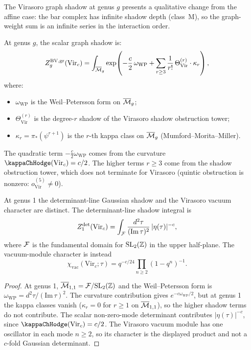 \begin{construction}
The Virasoro graph shadow at genus $g$ presents a qualitative
change from the affine case: the bar complex has infinite shadow depth
(class~M), so the graph-weight sum is an infinite series in the
interaction order.

At genus $g$, the scalar graph shadow is:
\begin{equation}
Z_g^{\mathrm{BV,gr}}(\mathrm{Vir}_c)
 = \int_{\overline{\mathcal{M}}_g}
 \exp\!\left(
 -\frac{c}{2} \, \omega_{\mathrm{WP}}
 + \sum_{r \geq 3}
 \frac{1}{r!}\, \Theta^{(r)}_{\mathrm{Vir}} \cdot \kappa_r
 \right),
\end{equation}
where:
\begin{itemize}
\item $\omega_{\mathrm{WP}}$ is the Weil--Petersson form on
 $\overline{\mathcal{M}}_g$;
\item $\Theta^{(r)}_{\mathrm{Vir}}$ is the degree-$r$ shadow of the
 Virasoro shadow obstruction tower;
\item $\kappa_r = \pi_*(\psi^{r+1})$ is the $r$-th kappa class on
 $\overline{\mathcal{M}}_g$ (Mumford--Morita--Miller).
\end{itemize}

The quadratic term $-\frac{c}{2} \omega_{\mathrm{WP}}$ comes from the
curvature $\kappaChHodge(\mathrm{Vir}_c) = c/2$. The higher terms $r \geq 3$
come from the shadow obstruction tower, which does not terminate for Virasoro
(quintic obstruction is nonzero:
$o^{(5)}_{\mathrm{Vir}} \neq 0$).
\end{construction}

\begin{proposition}
At genus 1 the determinant-line Gaussian shadow and the Virasoro vacuum
character are distinct. The determinant-line shadow integral is
\[
Z^{\mathrm{det}}_1(\mathrm{Vir}_c) = \int_{\mathcal{F}}
 \frac{d^2 \tau}{(\mathrm{Im}\, \tau)^2}
 \, |\eta(\tau)|^{-c},
\]
where $\mathcal{F}$ is the fundamental domain for $\mathrm{SL}_2(\mathbb{Z})$ in the
upper half-plane. The vacuum-module character is instead
\[
\chi_{\mathrm{vac}}(\mathrm{Vir}_c;\tau)
=q^{-c/24}\prod_{n\ge2}(1-q^n)^{-1}.
\]
\end{proposition}

\begin{proof}
At genus 1, $\overline{\mathcal{M}}_{1,1} = \mathcal{F} / \mathrm{SL}_2(\mathbb{Z})$ and the
Weil--Petersson form is $\omega_{\mathrm{WP}} = d^2\tau / (\mathrm{Im}\,
\tau)^2$. The curvature contribution gives $e^{-c \omega_{\mathrm{WP}}/2}$,
but at genus 1 the kappa classes vanish ($\kappa_r = 0$ for $r \geq 1$
on $\overline{\mathcal{M}}_{1,1}$), so the higher shadow terms do not contribute.
The scalar non-zero-mode determinant contributes
\(|\eta(\tau)|^{-c}\), since
\(\kappaChHodge(\mathrm{Vir}_c)=c/2\). The Virasoro vacuum module has
one oscillator in each mode \(n\ge2\), so its character is the displayed
product and not a \(c\)-fold Gaussian determinant.
\end{proof}

